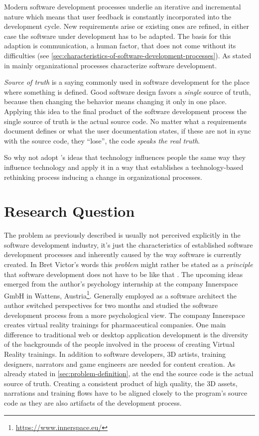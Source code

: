 Modern software development processes underlie an iterative and incremental nature \autocite{mayr_projekt_2005} which means that user feedback is constantly incorporated into the development cycle.
New requirements arise or existing ones are refined, in either case the software under development has to be adapted.
The basis for this adaption is communication, a human factor, that does not come without its difficulties (see \cref{sec:characteristics-of-software-development-processes}).
As stated in \textcite{curtis_psychology_1990} mainly organizational processes characterize software development.

\emph{Source of truth} is a saying commonly used in software development for the place where something is defined.
Good software design favors a \emph{single} source of truth, because then changing the behavior means changing it only in one place.
Applying this idea to the final product of the software development process the single source of truth is the actual source code.
No matter what a requirements document defines or what the user documentation states, if these are not in sync with the source code, they ``lose'', the code \emph{speaks the real truth}.

So why not adopt \citeauthor{schraube_ich_2012}'s ideas \autocite{schraube_ich_2012} that technology influences people the same way they influence technology and apply it in a way that establishes a technology-based rethinking process inducing a change in organizational processes.


\section{Research Question}
The problem as previously described is usually not perceived explicitly in the software development industry, it's just the characteristics of established software development processes and inherently caused by the way software is currently created.
In Bret Victor's words this \emph{problem} might rather be stated as a \emph{principle} that software development does not have to be like that \autocite{victor_inventing_2012}.
The upcoming ideas emerged from the author's psychology internship at the company Innerspace GmbH in Wattens, Austria\footnote{\url{https://www.innerspace.eu/}}.
Generally employed as a software architect the author switched perspectives for two months and studied the software development process from a more psychological view.
The company Innerspace creates virtual reality trainings for pharmaceutical companies.
One main difference to traditional web or desktop application development is the diversity of the backgrounds of the people involved in the process of creating Virtual Reality trainings.
In addition to software developers, 3D artists, training designers, narrators and game engineers are needed for content creation.
As already stated in \cref{sec:problem-definition}, at the end the source code is the actual source of truth.
Creating a consistent product of high quality, the 3D assets, narrations and training flows have to be aligned closely to the program's source code as they are also artifacts of the development process.

